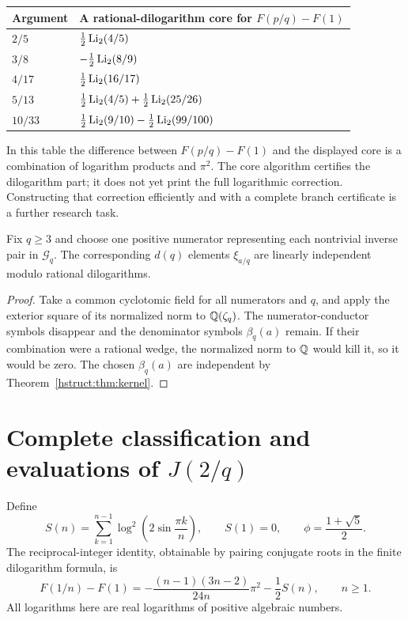 \begin{center}
\begin{tabular}{ll}
\toprule
Argument & A rational-dilogarithm core for $F(p/q)-F(1)$\\
\midrule
$2/5$ & $\tfrac12\operatorname{Li}_2(4/5)$\\
$3/8$ & $-\tfrac12\operatorname{Li}_2(8/9)$\\
$4/17$ & $\tfrac12\operatorname{Li}_2(16/17)$\\
$5/13$ & $\tfrac12\operatorname{Li}_2(4/5)+\tfrac12\operatorname{Li}_2(25/26)$\\
$10/33$ & $\tfrac12\operatorname{Li}_2(9/10)-\tfrac12\operatorname{Li}_2(99/100)$\\
\bottomrule
\end{tabular}
\end{center}
In this table the difference between $F(p/q)-F(1)$ and the displayed
core is a combination of logarithm products and $\pi^2$. The core
algorithm certifies the dilogarithm part; it does not yet print the full
logarithmic correction. Constructing that correction efficiently and
with a complete branch certificate is a further research task.

\begin{corollary}
Fix $q\ge3$ and choose one positive numerator representing each
nontrivial inverse pair in $\mathcal{G}_q$. The corresponding $d(q)$ elements
$\xi_{a/q}$ are linearly independent modulo rational dilogarithms.
\end{corollary}
\begin{proof}
Take a common cyclotomic field for all numerators and $q$, and apply the
exterior square of its normalized norm to $\mathbb{Q}(\zeta_q)$. The
numerator-conductor symbols disappear and the denominator symbols
$\beta_q(a)$ remain. If their combination were a rational wedge, the
normalized norm to $\mathbb{Q}$ would kill it, so it would be zero. The chosen
$\beta_q(a)$ are independent by Theorem~\ref{hstruct:thm:kernel}.
\end{proof}

\section{Complete classification and evaluations of \texorpdfstring{$J(2/q)$}{J(2/q)}}
\label{hstruct:sec:J}

Define
\[
 S(n)=\sum_{k=1}^{n-1}\log^2\!\left(2\sin\frac{\pi k}{n}\right),
 \qquad S(1)=0,
 \qquad \phi=\frac{1+\sqrt5}{2}.
\]
The reciprocal-integer identity, obtainable by pairing conjugate roots
in the finite dilogarithm formula, is
\begin{equation}\label{hstruct:eq:F1n}
 F(1/n)-F(1)
 =-\frac{(n-1)(3n-2)}{24n}\pi^2-\frac12 S(n),\qquad n\ge1.
\end{equation}
All logarithms here are real logarithms of positive algebraic numbers.

